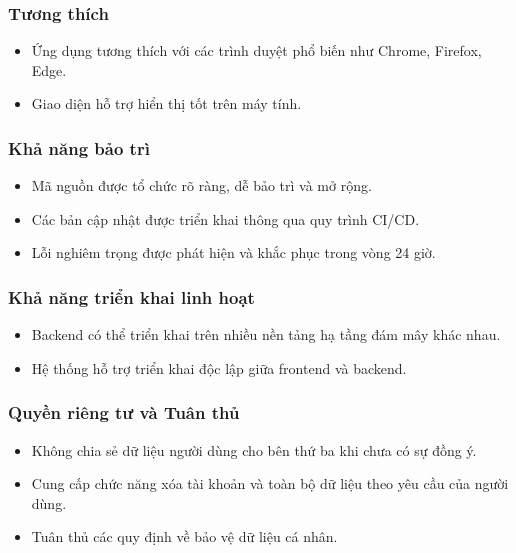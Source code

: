 \subsubsection{Tương thích}
\begin{itemize}[leftmargin=2.0cm]
	\item Ứng dụng tương thích với các trình duyệt phổ biến như Chrome, Firefox, Edge.
	\item Giao diện hỗ trợ hiển thị tốt trên máy tính.
\end{itemize}

\subsubsection{Khả năng bảo trì}
\begin{itemize}[leftmargin=2.0cm]
	\item Mã nguồn được tổ chức rõ ràng, dễ bảo trì và mở rộng.
	\item Các bản cập nhật được triển khai thông qua quy trình CI/CD.
	\item Lỗi nghiêm trọng được phát hiện và khắc phục trong vòng 24 giờ.
\end{itemize}

\subsubsection{Khả năng triển khai linh hoạt}
\begin{itemize}[leftmargin=2.0cm]
	\item Backend có thể triển khai trên nhiều nền tảng hạ tầng đám mây khác nhau.
	\item Hệ thống hỗ trợ triển khai độc lập giữa frontend và backend.
\end{itemize}

\subsubsection{Quyền riêng tư và Tuân thủ}
\begin{itemize}[leftmargin=2.0cm]
	\item Không chia sẻ dữ liệu người dùng cho bên thứ ba khi chưa có sự đồng ý.
	\item Cung cấp chức năng xóa tài khoản và toàn bộ dữ liệu theo yêu cầu của người dùng.
	\item Tuân thủ các quy định về bảo vệ dữ liệu cá nhân.
\end{itemize}

